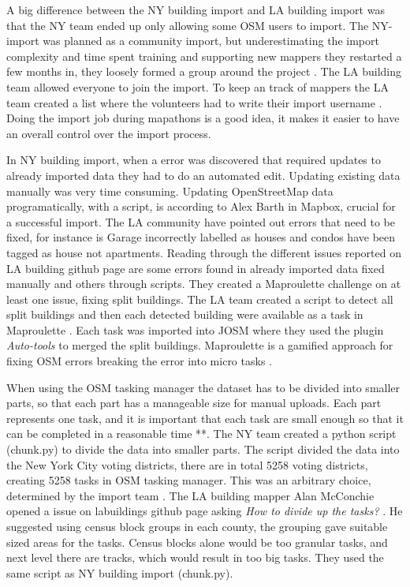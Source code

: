 A big difference between the NY building import and LA building import was that the NY team ended up only allowing some OSM users to import. The NY-import was planned as a community import, but underestimating the import complexity and time spent training and supporting new mappers they restarted a few months in,  they loosely formed a group around the project \cite{Barth2014}. The LA building team allowed everyone to join the import. To keep an track of mappers the LA team created a list where the volunteers had to write their import username \cite{Sambale2016s}. Doing the import job during mapathons is a good idea, it makes it easier to have an overall control over the import process. 

In NY building import, when a error was discovered that required updates to already imported data they had to do an automated edit. Updating existing data manually was very time consuming. Updating OpenStreetMap data programatically, with a script, is according to Alex Barth in Mapbox, crucial for a successful import.  The LA community have pointed out errors that need to be fixed, for instance is Garage incorrectly labelled as houses and condos have been tagged as house not apartments. Reading through the different issues reported on LA building github page are some errors found in already imported data fixed manually and others through scripts. They created a Maproulette challenge on at least one issue, fixing split buildings. The LA team created a script to detect all split buildings and then each detected building were available as a task in Maproulette \cite{Sambale2016a}. Each task was imported into JOSM where they used the plugin \textit{Auto-tools} to merged the split buildings. Maproulette is a gamified approach for fixing OSM errors breaking the error into micro tasks \cite{OpenStreetMap}.  

When using the OSM tasking manager the dataset has to be divided into smaller parts, so that each part has a manageable size for manual uploads. Each part represents one task, and it is important that each task are small enough so that it can be completed in a reasonable time \cite{HOT} **. The NY team created a python script (chunk.py) to divide the data into smaller parts. The script divided the data into the New York City voting districts, there are in total 5258 voting districts, creating 5258 tasks in OSM tasking manager. This was an arbitrary choice, determined by the import team \cite{Barth2014}. The LA building mapper Alan McConchie opened a issue on labuildings github page asking \textit{How to divide up the tasks?} \cite{McConchie2014}. He suggested using census block groups in each county, the grouping gave suitable sized areas for the tasks. Census blocks alone would be too granular tasks, and next level there are tracks, which would result in too big tasks. They used the same script as NY building import (chunk.py). 

